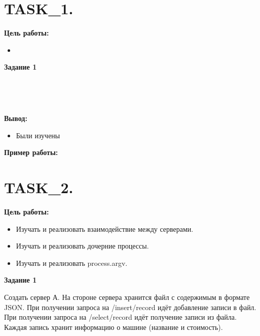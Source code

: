 \chapter{TASK\_1.}

\textbf{Цель работы:}

\begin{itemize} 
	\item 
\end{itemize}

\textbf{Задание 1}


\begin{lstlisting}[caption=Код программы. TASK\_1. Главнвая функция main]
	
\end{lstlisting}

\begin{lstlisting}[caption=Код программы. TASK\_1. Реализация заданий]
	
\end{lstlisting}


\textbf{Вывод:}

\begin{itemize} 
	\item Были изучены
\end{itemize}

\textbf{Пример работы:}



\chapter{TASK\_2.}

\textbf{Цель работы:}

\begin{itemize} 
	\item Изучать и реализовать взаимодействие между серверами.
	\item Изучать и реализовать дочерние процессы.
	\item Изучать и реализовать process.argv.
\end{itemize}

\textbf{Задание 1}

Создать сервер А. На стороне сервера хранится файл с содержимым в формате JSON. При получении запроса на /insert/record идёт добавление записи в файл. При получении запроса на /select/record идёт получение записи из файла. Каждая запись хранит информацию о машине (название и стоимость).

